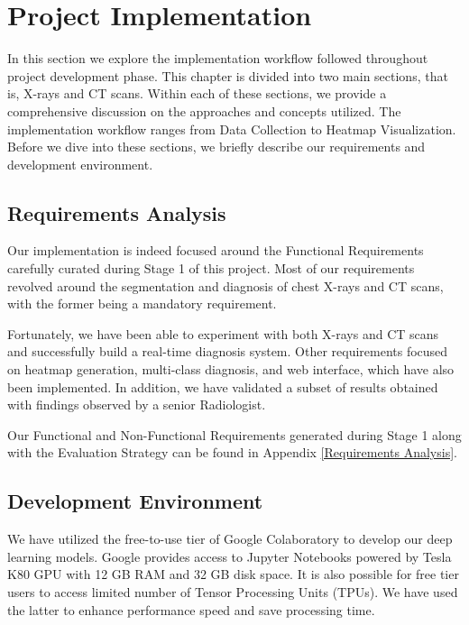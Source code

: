 \chapter{Project Implementation} \label{Project Implementation}

In this section we explore the implementation workflow followed throughout project development phase. This chapter is divided into two main sections, that is, X-rays and CT scans. Within each of these sections, we provide a comprehensive discussion on the approaches and concepts utilized. The implementation workflow ranges from Data Collection to Heatmap Visualization. Before we dive into these sections, we briefly describe our requirements and development environment. 

\section{Requirements Analysis}

Our implementation is indeed focused around the Functional Requirements carefully curated during Stage 1 of this project. Most of our requirements revolved around the segmentation and diagnosis of chest X-rays and CT scans, with the former being a mandatory requirement. 

Fortunately, we have been able to experiment with both X-rays and CT scans and successfully build a real-time diagnosis system. Other requirements focused on heatmap generation, multi-class diagnosis, and web interface, which have also been implemented. In addition, we have validated a subset of results obtained with findings observed by a senior Radiologist. 

Our Functional and Non-Functional Requirements generated during Stage 1 along with the Evaluation Strategy can be found in Appendix \ref{Requirements Analysis}.


\section{Development Environment} \label{devEnv}
We have utilized the free-to-use tier of Google Colaboratory to develop our deep learning models. Google provides access to Jupyter Notebooks powered by Tesla K80 GPU with 12 GB RAM and 32 GB disk space. It is also possible for free tier users to access limited number of Tensor Processing Units (TPUs). We have used the latter to enhance performance speed and save processing time.

